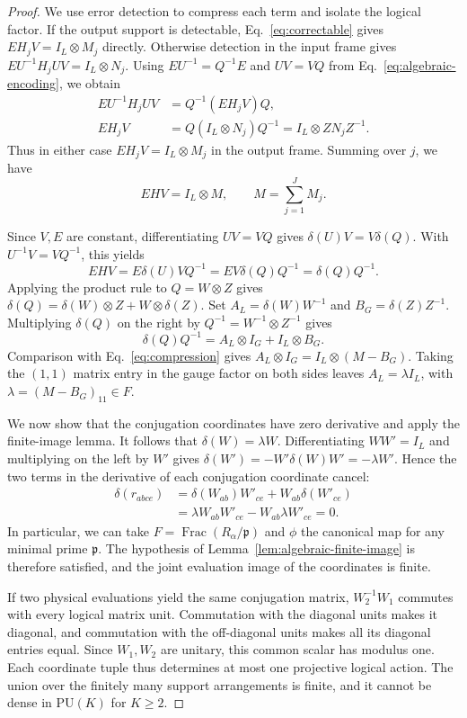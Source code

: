 \documentclass[aps,prl,reprint,notitlepage,nofootinbib,nobibnotes]{revtex4-2}
\newcommand{\PU}{\mathrm{PU}}
\newcommand{\id}{I}
\begin{document}
\begin{proof}
We use error detection to compress each term and isolate the logical factor.
If the output support is detectable, Eq.~\eqref{eq:correctable}
gives \(EH_jV=\id_L\otimes M_j\) directly. Otherwise detection in
the input frame gives \(EU^{-1}H_jUV=\id_L\otimes N_j\).
Using \(EU^{-1}=Q^{-1}E\) and \(UV=VQ\) from
Eq.~\eqref{eq:algebraic-encoding}, we obtain
\begin{align*}
 EU^{-1}H_jUV&=Q^{-1}(EH_jV)Q,\\
 EH_jV&=Q(\id_L\otimes N_j)Q^{-1}
       =\id_L\otimes ZN_jZ^{-1}.
\end{align*}
Thus in either case \(EH_jV=\id_L\otimes M_j\) in the output
frame. Summing over \(j\), we have
\begin{equation}\label{eq:compression}
 EHV=\id_L\otimes M,\qquad M=\sum_{j=1}^J M_j.
\end{equation}

Since \(V,E\) are constant, differentiating \(UV=VQ\) gives
\(\delta(U)V=V\delta(Q)\). With \(U^{-1}V=VQ^{-1}\), this yields
\[
 EHV=E\delta(U)VQ^{-1}
     =EV\delta(Q)Q^{-1}
     =\delta(Q)Q^{-1}.
\]
Applying the product rule to \(Q=W\otimes Z\) gives
\(\delta(Q)=\delta(W)\otimes Z+W\otimes\delta(Z)\). Set
\(A_L=\delta(W)W^{-1}\) and \(B_G=\delta(Z)Z^{-1}\).
Multiplying \(\delta(Q)\) on the right by
\(Q^{-1}=W^{-1}\otimes Z^{-1}\) gives
\begin{equation}\label{eq:logicalgen}
 \delta(Q)Q^{-1}=A_L\otimes\id_G+\id_L\otimes B_G.
\end{equation}
Comparison with Eq.~\eqref{eq:compression} gives
\(A_L\otimes\id_G=\id_L\otimes(M-B_G)\). Taking the \((1,1)\)
matrix entry in the gauge factor on both sides leaves
\(A_L=\lambda\id_L\), with \(\lambda=(M-B_G)_{11}\in F\).

We now show that the conjugation coordinates have zero derivative and apply the finite-image lemma.
It follows that \(\delta(W)=\lambda W\). Differentiating \(WW'=\id_L\)
and multiplying on the left by \(W'\) gives
\(\delta(W')=-W'\delta(W)W'=-\lambda W'\).
Hence the two terms in the derivative of each conjugation coordinate
cancel:
\[
 \begin{aligned}
 \delta(r_{abce})&=\delta(W_{ab})W'_{ce}+W_{ab}\delta(W'_{ce})\\
                 &=\lambda W_{ab}W'_{ce}-W_{ab}\lambda W'_{ce}=0.
 \end{aligned}
\]
In particular, we can take \(F=\operatorname{Frac}(R_\alpha/\mathfrak p)\)
and \(\phi\) the canonical map for any minimal prime \(\mathfrak p\).
The hypothesis of Lemma~\ref{lem:algebraic-finite-image} is therefore
satisfied, and the joint evaluation image of the coordinates is finite.

If two physical evaluations yield the same conjugation matrix,
\(W_2^{-1}W_1\) commutes with every logical matrix unit. Commutation with
the diagonal units makes it diagonal, and commutation with the
off-diagonal units makes all its diagonal entries equal.
Since \(W_1,W_2\) are unitary, this common scalar has modulus one.
Each coordinate tuple thus determines at most one projective logical
action. The union over the finitely many support arrangements is
finite, and it cannot be dense in \(\PU(K)\) for \(K\ge2\).
\end{proof}
\end{document}

